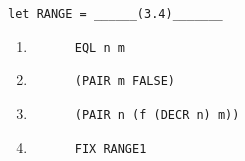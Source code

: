 \documentclass[paper=letter, fontsize=13pt]{article} %
\numberwithin{equation}{section} %
\newif\ifshowanswers\showanswerstrue
\begin{document}
\begin{enumerate}
\begin{verbatim}
let RANGE = ______(3.4)_______
\end{verbatim}

\ifshowanswers
\begin{enumerate}[label*=\arabic*]
\item \begin{minipage}[t][8em]{0.5\textwidth}
  \begin{lstlisting}
      EQL n m 
  \end{lstlisting}
\end{minipage}

\item \begin{minipage}[t][8em]{0.5\textwidth}
  \begin{lstlisting}
      (PAIR m FALSE)
  \end{lstlisting}
 \end{minipage}
\item \begin{minipage}[t][8em]{0.5\textwidth}
  \begin{lstlisting}
      (PAIR n (f (DECR n) m))
  \end{lstlisting}
    \end{minipage}
\item \begin{minipage}[t][8em]{0.5\textwidth}
  \begin{lstlisting}
      FIX RANGE1
  \end{lstlisting}
    \end{minipage}
\end{enumerate}
\else
\begin{enumerate}[label*=\arabic*]
  \item \framebox[0.75\textwidth]{\begin{minipage}[t][8em]{0.75\textwidth} \end{minipage}}
  \item \framebox[0.75\textwidth]{\begin{minipage}[t][8em]{0.75\textwidth} \end{minipage}}
  \item \framebox[0.75\textwidth]{\begin{minipage}[t][8em]{0.75\textwidth} \end{minipage}}
  \item \framebox[0.75\textwidth]{\begin{minipage}[t][8em]{0.75\textwidth} \end{minipage}}
\end{enumerate}
\fi


\end{enumerate}
\end{document}
